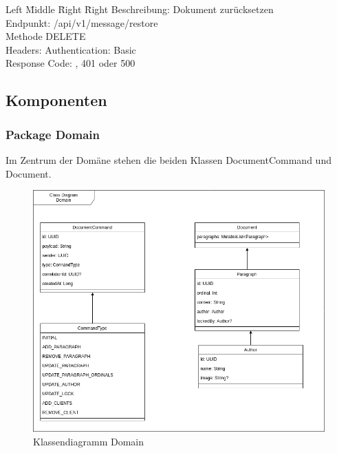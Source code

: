 \begin{tabbing}
    Left \= Middle \= Right \= Right \kill
    Beschreibung:  \> \> \> Dokument zurücksetzen \\
    Endpunkt:  \> \> \> /api/v1/message/restore\\
    Methode \>  \> \> DELETE\\
    Headers:  \> \>   \> Authentication: Basic\\
    Response Code:  \> \>  , 401 oder 500 \\
\end{tabbing}

\clearpage

\subsection{Komponenten}\label{subsec:komponenten}

\subsubsection{Package Domain}

Im Zentrum der Domäne stehen die beiden Klassen DocumentCommand und Document.

\begin{figure}[h]
    \centering
    \begin{minipage}[b]{0.8\textwidth}
        \includegraphics[width=\textwidth]{graphics/class-be-domain.drawio}
        \caption{Klassendiagramm Domain}
    \end{minipage}
\end{figure}

